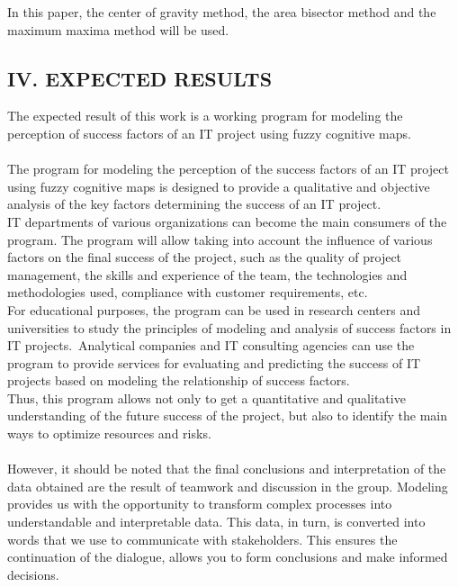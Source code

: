 \documentclass{article}
\begin{document}
    \begin{minipage}{0.49\textwidth}
        In this paper, the center of gravity method, the area bisector method and the maximum maxima method will be used.
        \begin{center}
            \chapter{IV. EXPECTED RESULTS}
        \end{center}
        The expected result of this work is a working program for modeling the perception of success factors of an IT project using fuzzy cognitive maps.\\
        ~\\
        The program for modeling the perception of the success factors of an IT project using fuzzy cognitive maps is designed to provide a qualitative and objective analysis of the key factors determining the success of an IT project.
        \\ IT departments of various organizations can become the main consumers of the program. The program will allow taking into account the influence of various factors on the final success of the project, such as the quality of project management, the skills and experience of the team, the technologies and methodologies used, compliance with customer requirements, etc.\\
        For educational purposes, the program can be used in research centers and universities to study the principles of modeling and analysis of success factors in IT projects.\
        Analytical companies and IT consulting agencies can use the program to provide services for evaluating and predicting the success of IT projects based on modeling the relationship of success factors.
        ~\\
        Thus, this program allows not only to get a quantitative and qualitative understanding of the future success of the project, but also to identify the main ways to optimize resources and risks.\\
        ~\\
        However, it should be noted that the final conclusions and interpretation of the data obtained are the result of teamwork and discussion in the group. Modeling provides us with the opportunity to transform complex processes into understandable and interpretable data. This data, in turn, is converted into words that we use to communicate with stakeholders. This ensures the continuation of the dialogue, allows you to form conclusions and make informed decisions.\\

\end{minipage}
\end{document}
